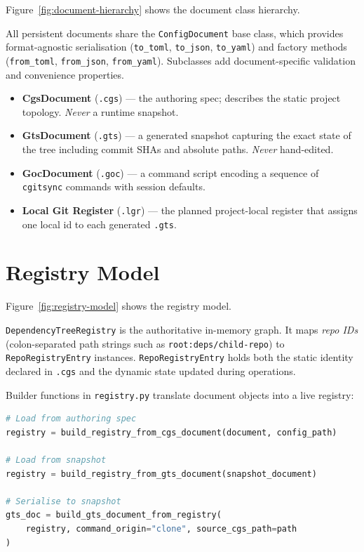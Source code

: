 Figure~\ref{fig:document-hierarchy} shows the document class hierarchy.

All persistent documents share the \texttt{ConfigDocument} base class, which
provides format-agnostic serialisation (\texttt{to\_toml}, \texttt{to\_json},
\texttt{to\_yaml}) and factory methods (\texttt{from\_toml}, \texttt{from\_json},
\texttt{from\_yaml}).  Subclasses add document-specific validation and
convenience properties.

\begin{itemize}
  \item \textbf{CgsDocument} (\texttt{.cgs}) — the authoring spec; describes
    the static project topology.  \emph{Never} a runtime snapshot.
  \item \textbf{GtsDocument} (\texttt{.gts}) — a generated snapshot capturing
    the exact state of the tree including commit SHAs and absolute paths.
    \emph{Never} hand-edited.
  \item \textbf{GocDocument} (\texttt{.goc}) — a command script encoding a
     sequence of \texttt{cgitsync} commands with session defaults.
  \item \textbf{Local Git Register} (\texttt{.lgr}) — the planned project-local
    register that assigns one local id to each generated \texttt{.gts}.
\end{itemize}

\section{Registry Model}
\label{sec:registry-model}

Figure~\ref{fig:registry-model} shows the registry model.

\texttt{DependencyTreeRegistry} is the authoritative in-memory graph.  It maps
\emph{repo IDs} (colon-separated path strings such as
\texttt{root:deps/child-repo}) to \texttt{RepoRegistryEntry} instances.
\texttt{RepoRegistryEntry} holds both the static identity declared in
\texttt{.cgs} and the dynamic state updated during operations.

Builder functions in \texttt{registry.py} translate document objects into a
live registry:

\begin{lstlisting}[language=Python]
# Load from authoring spec
registry = build_registry_from_cgs_document(document, config_path)

# Load from snapshot
registry = build_registry_from_gts_document(snapshot_document)

# Serialise to snapshot
gts_doc = build_gts_document_from_registry(
    registry, command_origin="clone", source_cgs_path=path
)
\end{lstlisting}




